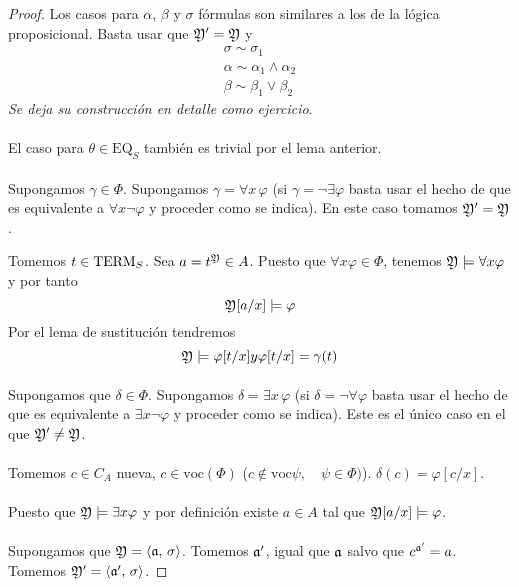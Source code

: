\begin{proof}
Los casos para $\alpha$, $\beta$ y $\sigma$ fórmulas son similares a los de la lógica proposicional. Basta usar que $\mathfrak{Y}'=\mathfrak{Y}$ y 
\[ \begin{matrix}
	\sigma \sim \sigma_1\\
	\alpha \sim \alpha_1 \wedge \alpha_2\\
	\beta \sim \beta_1 \lor \beta_2	
\end{matrix} \]
\textit{Se deja su construcción en detalle como ejercicio}. 
\paragraph{}
El caso para $\theta \in \mbox{EQ}_S$ también es trivial por el lema anterior. 
\paragraph{}
Supongamos $\gamma \in \Phi$. Supongamos $\gamma= \forall x \, \varphi$ (si $\gamma = \neg \exists \varphi$ basta usar el hecho de que es equivalente a $\forall x \neg \varphi$ y proceder como se indica). En este caso tomamos $\mathfrak{Y}'=\mathfrak{Y}$. 

Tomemos $t \in \mbox{TERM}_{S}$. Sea $a=t^{\mathfrak{Y}} \in A$. Puesto que $\forall x \varphi \in \Phi$, tenemos $\mathfrak{Y} \models \forall x \varphi$ y por tanto 
\[ \mathfrak{Y}[a/x] \models \varphi \]
Por el lema de sustitución tendremos 
\[ \mathfrak{Y} \models \varphi[t/x]  y \varphi[t/x] = \gamma(t) \]
\paragraph{}
Supongamos que $\delta \in \Phi$. Supongamos $\delta= \exists x \, \varphi$ (si $\delta = \neg \forall \varphi$ basta usar el hecho de que es equivalente a $\exists x \neg \varphi$ y proceder como se indica). Este es el único caso en el que $\mathfrak{Y}' \neq \mathfrak{Y}$.
\paragraph{}
Tomemos $c \in C_A$ nueva, $c \in \mbox{voc}(\Phi)$ ($c \not \in \mbox{voc}{\psi}, \quad \psi \in \Phi)$). $\delta(c)= \varphi[c/x]$.
\paragraph{}
Puesto que $\mathfrak{Y} \models \exists x \varphi$ y por definición existe $a \in A$ tal que $\mathfrak{Y}[a/x] \models \varphi$. 
\paragraph{}
Supongamos que $\mathfrak{Y}=\langle \mathfrak{a}, \, \sigma \rangle$. Tomemos $\mathfrak{a}'$, igual que $\mathfrak{a}$ salvo que $c^{\mathfrak{a}'}=a$. Tomemos $\mathfrak{Y}'=\langle \mathfrak{a}', \, \sigma \rangle $.

\end{proof}
